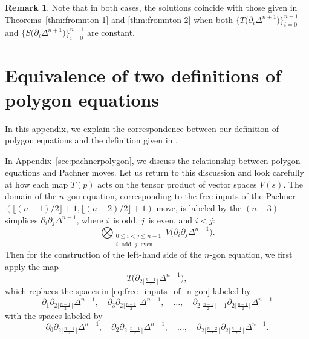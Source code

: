 \documentclass[pdftex]{sigma}
\numberwithin{equation}{section}
\theoremstyle{definition}
\newtheorem{Remark}[Theorem]{Remark}
\begin{document}
\begin{Remark}
 Note that in both cases, the solutions coincide with those given in Theorems~\ref{thm:fromnton-1} and \ref{thm:fromnton-2} when both $\bigl\{T\bigl(\partial_i\Delta^{n+1}\bigr)\bigr\}_{i=0}^{n+1}$ and $\bigl\{S\bigl(\partial_i\Delta^{n+1}\bigr)\bigr\}_{i=0}^{n+1}$ are constant.
\end{Remark}


\section{Equivalence of two definitions of polygon equations}\label{sec:equivalence}
In this appendix, we explain the correspondence between our definition of polygon equations and the definition given in \cite{dimakis2015simplex}.

In Appendix~\ref{sec:pachnerpolygon}, we discuss the relationship between polygon equations and Pachner moves. Let us return to this discussion and look carefully at how each map $T(p)$ acts on the tensor product of vector spaces $V(s)$.
The domain of the $n$-gon equation, corresponding to the free inputs of the Pachner $(\lfloor(n-1)/2\rfloor+1,\lfloor (n-2)/2\rfloor+1)$-move, is labeled by the $(n-3)$-simplices $\partial_i\partial_j\Delta^{n-1}$, where $i$~is odd, $j$~is even, and $i<j$:
\begin{equation}\label{eq:free_inputs_of_n-gon}
 \bigotimes_{\substack{0\leq i<j\leq n-1\\\text{$i$: odd, $j$: even}}} V\bigl(\partial_i\partial_j\Delta^{n-1}\bigr).
\end{equation}
Then for the construction of the left-hand side of the $n$-gon equation, we first apply the map
\[
T\bigl(\partial_{2\lfloor\frac{n-1}{2}\rfloor}\Delta^{n-1}\bigr),
\]
which replaces the spaces in \eqref{eq:free_inputs_of_n-gon} labeled by
\begin{equation*}
 \partial_1\partial_{2\lfloor\frac{n-1}{2}\rfloor}\Delta^{n-1},\quad \partial_3\partial_{2\lfloor\frac{n-1}{2}\rfloor}\Delta^{n-1},\quad\dots,\quad\partial_{2\lfloor\frac{n-1}{2}\rfloor-1}\partial_{2\lfloor\frac{n-1}{2}\rfloor}\Delta^{n-1}
\end{equation*}
with the spaces labeled by
\begin{equation*}
 \partial_0\partial_{2\lfloor\frac{n-1}{2}\rfloor}\Delta^{n-1},\quad \partial_2\partial_{2\lfloor\frac{n-1}{2}\rfloor}\Delta^{n-1},\quad\dots,\quad \partial_{2\lfloor\frac{n-2}{2}\rfloor}\partial_{2\lfloor\frac{n-1}{2}\rfloor}\Delta^{n-1}.
\end{equation*}
\end{document}
